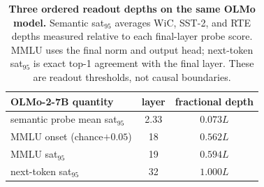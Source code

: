 \begin{table}[t]
\centering
\scriptsize
\setlength{\tabcolsep}{4pt}
\begin{tabular}{@{}lcc@{}}
\toprule
\textbf{OLMo-2-7B quantity} & \textbf{layer} & \textbf{fractional depth} \\
\midrule
semantic probe mean sat$_{95}$ & 2.33 & $0.073L$ \\
MMLU onset (chance$+0.05$) & 18 & $0.562L$ \\
MMLU sat$_{95}$ & 19 & $0.594L$ \\
next-token sat$_{95}$ & 32 & $1.000L$ \\
\bottomrule
\end{tabular}
\caption{\textbf{Three ordered readout depths on the same OLMo model.}
Semantic sat$_{95}$ averages WiC, SST-2, and RTE depths measured relative to
each final-layer probe score. MMLU uses the final norm and output head;
next-token sat$_{95}$ is exact top-1 agreement with the final layer. These are
readout thresholds, not causal boundaries.}
\label{tab:mechanism}
\end{table}

